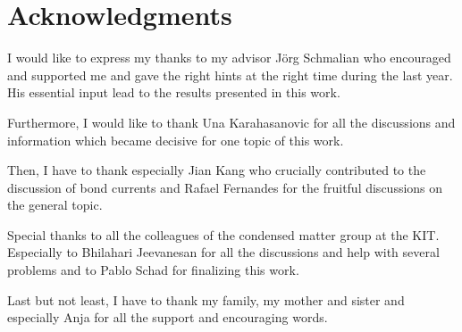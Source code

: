 \chapter{Acknowledgments}

I would like to express my thanks to my advisor J\"org Schmalian who encouraged and supported me and gave the right hints at the right time during the last year. 
His essential input lead to the results presented in this work. 

Furthermore, I would like to thank Una Karahasanovic for all the discussions and information which became decisive for one topic of this work. 

Then, I have to thank especially Jian Kang who crucially contributed to the discussion of bond currents and Rafael Fernandes for the fruitful discussions on the general topic. 

Special thanks to all the colleagues of the condensed matter group at the KIT. Especially to Bhilahari Jeevanesan for all the discussions and help with several problems and to Pablo Schad for finalizing this work. 

Last but not least, I have to thank my family, my mother and sister and especially Anja for all the support and encouraging words. 
 
